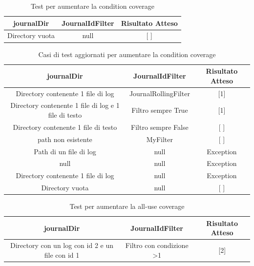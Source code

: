 \documentclass[12pt, a4paper]{article}
\begin{document}
\begin{table}[ht]
  \centering
  \caption[Journal: Test Suite - Adequacy Control Flow 3]{Test per aumentare la condition coverage}
  \begin{tabular}{|c|c|c|}
    \hline
    journalDir & JournalIdFilter & Risultato Atteso \\
    \hline
    {Directory vuota} & null & [ ] \\
    \hline
  \end{tabular}
  \label{tab:ACF3ListJournalIds}
\end{table}

\begin{table}[ht]
  \centering
  \caption[Journal: Test Suite - Adequacy Control Flow 4]{Casi di test aggiornati per aumentare la condition coverage}
  \begin{tabular}{|c|c|c|}
  \hline
  journalDir & JournalIdFilter & Risultato Atteso \\
  \hline
  {Directory contenente 1 file di log} & JournalRollingFilter & [1] \\
  {Directory contenente 1 file di log e 1 file di testo} & Filtro sempre True & [1] \\
  {Directory contenente 1 file di testo} & Filtro sempre False & [ ] \\
  {path non esistente} & MyFilter & [ ] \\
  {Path di un file di log} & null & Exception \\
  null & null & Exception \\
  {Directory contenente 1 file di log} & null & Exception \\
  {Directory vuota} & null & [ ] \\
  \hline
  \end{tabular}
  \label{tab:ACF4ListJournalIds}
\end{table}

  \begin{table}[ht]
    \centering
    \caption[Journal: Test Suite - Adequacy Data Flow 1]{Test per aumentare la all-use coverage}
    \begin{tabular}{|c|c|c|}
      \hline
      journalDir & JournalIdFilter & Risultato Atteso \\
      \hline
      {Directory con un log con id 2 e un file con id 1} & {Filtro con condizione >1} & [2] \\
      \hline
    \end{tabular}
    \label{tab:ADF1ListJournalIds}
  \end{table}
\end{document}
